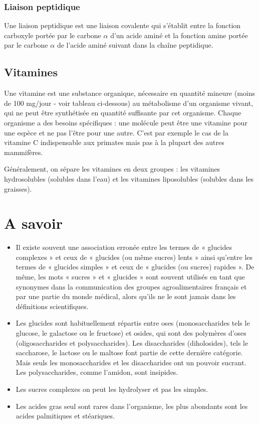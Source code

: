 \documentclass[11pt]{report}
\numberwithin{figure}{section}
\numberwithin{equation}{section}
\numberwithin{table}{section}
\newcommand{\1}{\boldsymbol{1}}
\begin{document}
\subsubsection{Liaison peptidique}

Une liaison peptidique est une liaison covalente qui s'établit entre la fonction carboxyle portée par le carbone $\alpha$ d'un acide aminé et la fonction amine portée par le carbone $\alpha$ de l'acide aminé suivant dans la chaîne peptidique.


\subsection{Vitamines}

Une vitamine est une substance organique, nécessaire en quantité mineure (moins de 100 mg/jour - voir tableau ci-dessous) au métabolisme d'un organisme vivant, qui ne peut être synthétisée en quantité suffisante par cet organisme. Chaque organisme a des besoins spécifiques : une molécule peut être une vitamine pour une espèce et ne pas l'être pour une autre. C'est par exemple le cas de la vitamine C indispensable aux primates mais pas à la plupart des autres mammifères.

Généralement, on sépare les vitamines en deux groupes : les vitamines hydrosolubles (solubles dans l'eau) et les vitamines liposolubles (solubles dans les graisses).

\section{A savoir}
\begin{itemize}
\item Il existe souvent une association erronée entre les termes de « glucides complexes » et ceux de « glucides (ou même sucres) lents » ainsi qu'entre les termes de « glucides simples » et ceux de « glucides (ou sucres) rapides ». De même, les mots « sucres » et « glucides » sont souvent utilisés en tant que synonymes dans la communication des groupes agroalimentaires français et par une partie du monde médical, alors qu'ils ne le sont jamais dans les définitions scientifiques.
\item Les glucides sont habituellement répartis entre oses (monosaccharides tels le glucose, le galactose ou le fructose) et osides, qui sont des polymères d'oses (oligosaccharides et polysaccharides). Les disaccharides (diholosides), tels le saccharose, le lactose ou le maltose font partie de cette dernière catégorie. Mais seuls les monosaccharides et les disaccharides ont un pouvoir sucrant. Les polysaccharides, comme l'amidon, sont insipides.
\item Les sucres complexes on peut les hydrolyser et pas les simples.
\item Les acides gras seul sont rares dans l’organisme, les plus abondants sont
les acides palmitiques et stéariques.
\end{itemize}
\end{document}
